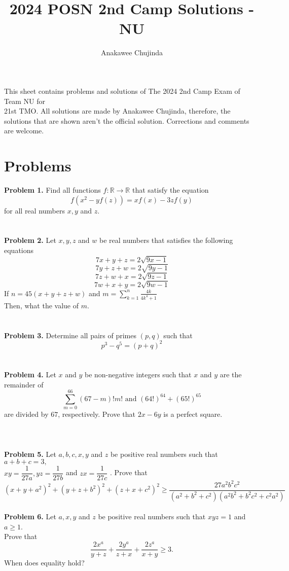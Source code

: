 \documentclass[12pt]{article}
\title{2024 POSN 2nd Camp Solutions - NU}
\author{Anakawee Chujinda}
\date{}
\begin{document}
\maketitle 
\hspace{11pt} This sheet contains problems and solutions of The 2024 2nd Camp Exam of Team NU for\\ 21st TMO. All solutions are made by Anakawee Chujinda, therefore, the solutions that are shown aren't the official solution. Corrections and comments are welcome.
\newpage
\section{Problems}
\textbf{Problem 1.  } Find all functions $f : \mathbb{R} \rightarrow \mathbb{R}$  that satisfy the equation $$f(x^2-yf(z))=xf(x)-3zf(y)$$ for all real numbers $x,y$ and $z$.\\ \\ \\ 
\textbf{Problem 2.  }Let $x,y,z$ and $w$ be real numbers that satisfies the following equations $$7x+y+z = 2\sqrt{9x-1}$$ $$7y+z+w = 2\sqrt{9y-1}$$ $$7z+w+x = 2\sqrt{9z-1}$$ $$7w+x+y = 2\sqrt{9w-1}$$ If $n = 45(x+y+z+w)$ and $m =\displaystyle \sum^{n}_{k=1} \frac{4k}{4k^{4}+1}$ \\ Then, what  the value of $m$. \\ \\ \\ 
 \textbf{Problem 3.  }Determine all pairs of primes $(p,q)$ such that $$p^3-q^5=(p+q)^2$$ \\ \\
 \textbf{Problem 4.  }Let $x$ and $y$ be non-negative integers such that $x$ and $y$  are the remainder of $$\displaystyle \sum^{66}_{m=0} (67-m)!m! \text{  and  }  (64!)^{64}+(65!)^{65}$$ are divided by $67$, respectively.  Prove that $2x-6y$ is a perfect square. \\ \\ \\ \\
  \textbf{Problem 5.  } Let  $a,b,c,x,y$ and $z$ be positive real numbers such that $a+b+c=3 ,$ \\ $ xy = \dfrac{1}{27a} ,yz = \dfrac{1}{27b} $ and $zx = \dfrac{1}{27c}$ . Prove that 
$$ (x+y+a^2)^2 + (y+z+b^2)^2 + (z+x+c^2)^2 \geq \dfrac{27a^2b^2c^2}{(a^2+b^2+c^2)(a^2b^2+b^2c^2+c^2a^2)}$$ \\
  \textbf{Problem 6.  }  Let $a,x,y$ and $z$ be positive real numbers such that $xyz=1$ and $a \geq 1$.  \\ Prove that  $$  \dfrac{2x^a}{y+z} + \dfrac{2y^a}{z+x} + \dfrac{2z^a}{x+y} \geq 3.$$ When does equality hold? \\ \\
\end{document}
